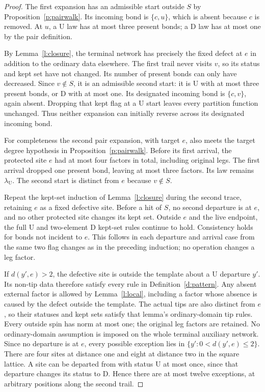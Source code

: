 \begin{proof}
The first expansion has an admissible start outside \(S\) by
Proposition~\ref{p:pairwalk}.  Its incoming bond is \(\{c,u\}\),
which is absent because \(c\) is removed.  At \(u\), a
\(\mathrm U\) law has at most three present bonds; a
\(\mathrm D\) law has at most one by the pair definition.

By Lemma~\ref{l:closure}, the terminal network has precisely the
fixed defect at \(e\) in addition to the ordinary data elsewhere.
The first trail never visits \(v\), so its status and kept set
have not changed.  Its number of present bonds can only have
decreased.  Since \(v\notin S\), it is an admissible second start:
it is \(\mathrm U\) with at most three present bonds, or
\(\mathrm D\) with at most one.  Its designated incoming bond is
\(\{c,v\}\), again absent.  Dropping that kept flag at a
\(\mathrm U\) start leaves every partition function unchanged.
Thus neither expansion can initially reverse across its designated
incoming bond.

For completeness the second pair expansion, with target \(e\),
also meets the target degree hypothesis in
Proposition~\ref{p:pairwalk}.  Before its first arrival, the
protected site \(e\) had at most four factors in total, including
original legs.  The first arrival dropped one present bond, leaving
at most three factors.  Its law remains \(\lambda_{\mathrm U}\).
The second start is distinct from \(e\) because \(v\notin S\).

Repeat the kept-set induction of Lemma~\ref{l:closure} during the
second trace, retaining \(e\) as a fixed defective site.  Before a
hit of \(S\), no second departure is at \(e\), and no other
protected site changes its kept set.  Outside \(e\) and the live
endpoint, the full \(\mathrm U\) and two-element \(\mathrm D\)
kept-set rules continue to hold.  Consistency holds for bonds not
incident to \(e\).  This follows in each departure and arrival
case from the same two flag changes as in the preceding induction;
no operation changes a leg factor.

If \(d(y',e)>2\), the defective site is outside the template
about a \(\mathrm U\) departure \(y'\).  Its non-tip data
therefore satisfy every rule in Definition~\ref{d:pattern}.
Any absent external factor is allowed by Lemma~\ref{l:local},
including a factor whose absence is caused by the defect outside
the template.  The actual tips are also distinct from \(e\),
so their statuses and kept sets satisfy that lemma's ordinary-domain
tip rules.  Every outside spin has norm at most one; the original
leg factors are retained.  No ordinary-domain assumption is imposed
on the whole terminal auxiliary network.  Since no departure is
at \(e\), every possible
exception lies in
\(\{y':0<d(y',e)\le2\}\).  There are four sites at distance
one and eight at distance two in the square lattice.  A site can
be departed from with status \(\mathrm U\) at most once, since
that departure changes its status to \(\mathrm D\).  Hence there
are at most twelve exceptions, at arbitrary positions along the
second trail.


\end{proof}
